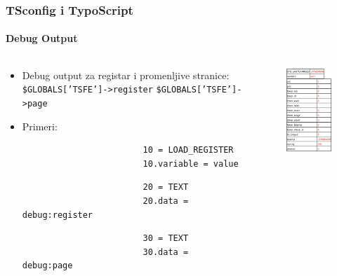 \begin{frame}[fragile]
	\frametitle{TSconfig i TypoScript}
	\framesubtitle{Debug Output}

	\begin{columns}[T]

		\begin{column}{.6\textwidth}
			\begin{itemize}
				\item Debug output za registar i promenljive stranice:\newline
					\texttt{\$GLOBALS['TSFE']->register}\newline
					\texttt{\$GLOBALS['TSFE']->page}

				\item Primeri:

					\begin{lstlisting}
						10 = LOAD_REGISTER
						10.variable = value
					\end{lstlisting}

					\begin{lstlisting}
						20 = TEXT
						20.data = debug:register
					\end{lstlisting}

					\begin{lstlisting}
						30 = TEXT
						30.data = debug:page
					\end{lstlisting}

			\end{itemize}
		\end{column}

		\begin{column}{.4\textwidth}
			\begin{figure}\vspace*{-0.4cm}
				\includegraphics[width=0.6\linewidth]{Images/TypoScript/DebugRegisterAndPage.png}
			\end{figure}
		\end{column}


\end{columns}
\end{frame}

